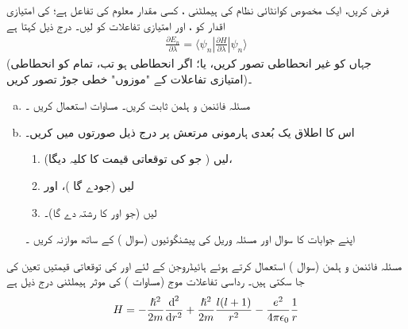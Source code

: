 فرض کریں،  ایک مخصوص کوانٹائی نظام کی  ہیملٹنی  ،  کسی مقدار معلوم     کی  تفاعل ہے؛ کی  امتیازی اقدار کو ،   اور امتیازی تفاعلات کو   لیں۔      درج ذیل کہتا ہے
\begin{align}\label{مساوات_غیر_مضطرب_مسئلہ_فائنمن}
\frac{\partial E_{n}}{\partial \lambda}=\big\langle{\psi_{n}|\frac{\partial{H}}{\partial{\lambda}}|\psi_{n}}\big\rangle
\end{align}
(جہاں   کو غیر انحطاطی تصور کریں،  یا؛ اگر انحطاطی ہو تب،  تمام کو انحطاطی امتیازی تفاعلات کے "موزوں" خطی جوڑ تصور کریں)۔
\begin{enumerate}[a.]
\item
   مسئلہ فائنمن و ہلمن    ثابت کریں۔   مساوات  استعمال کریں ۔ 
\item
  اس کا اطلاق یک بُعدی  ہارمونی  مرتعش   پر  درج ذیل   صورتوں میں کریں۔
\begin{enumerate}[1.]  
\item
  لیں ( جو  کی توقعاتی قیمت کا کلیہ دیگا)، 
  \item
  لیں (جودے گا )، اور
  \item
  لیں (جو اور کا  رشتہ دے گا)۔
 \end{enumerate}
    اپنے جوابات کا سوال اور مسئلہ  وریل   کی پیشنگوئیوں  (سوال )   کے ساتھ موازنہ  کریں ۔
 \end{enumerate}
مسئلہ فائنمن و ہلمن (سوال )  استعمال کرتے ہوئے ہائیڈروجن کے  لئے   اور   کی توقعاتی قیمتیں تعین  کی جا سکتی ہیں۔  رداسی تفاعلات موج    (مساوات ) کی  موثر  ہیملٹنی  درج ذیل ہے 
\begin{align*}
H=-\frac{\hslash^{2}}{2m}\frac{\dif^{\,2}}{\dif r^{2}}+\frac{\hslash^{2}}{2m}\frac{l(l+1)}{r^{2}}-\frac{e^{2}}{4\pi\epsilon_0}\frac{1}{r}
\end{align*}
